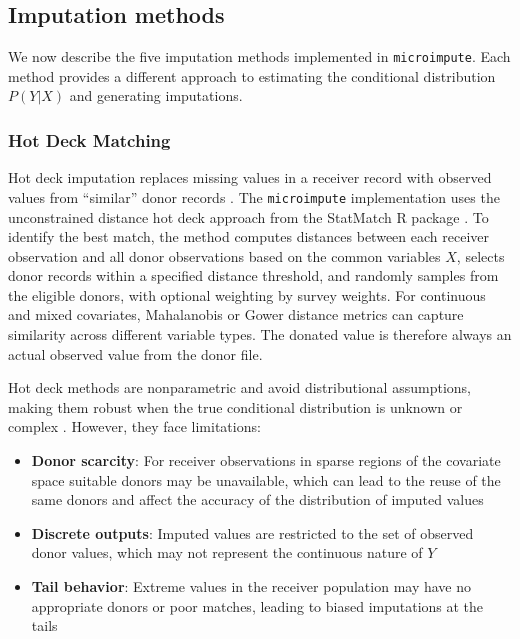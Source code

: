 \subsection{Imputation methods}

We now describe the five imputation methods implemented in \texttt{microimpute}. Each method provides a different approach to estimating the conditional distribution $P(Y|X)$ and generating imputations.

\subsubsection{Hot Deck Matching}

Hot deck imputation replaces missing values in a receiver record with observed values from ``similar'' donor records \citep{andridge2010review}. The \texttt{microimpute} implementation uses the unconstrained distance hot deck approach from the StatMatch R package \citep{dorazio2021statistical}. To identify the best match, the method computes distances between each receiver observation and all donor observations based on the common variables $X$, selects donor records within a specified distance threshold, and randomly samples from the eligible donors, with optional weighting by survey weights. For continuous and mixed covariates, Mahalanobis or Gower distance metrics can capture similarity across different variable types. The donated value is therefore always an actual observed value from the donor file.

Hot deck methods are nonparametric and avoid distributional assumptions, making them robust when the true conditional distribution is unknown or complex \citep{dorazio2006statistical}. However, they face limitations:
\begin{itemize}
    \item \textbf{Donor scarcity}: For receiver observations in sparse regions of the covariate space suitable donors may be unavailable, which can lead to the reuse of the same donors and affect the accuracy of the distribution of imputed values
    \item \textbf{Discrete outputs}: Imputed values are restricted to the set of observed donor values, which may not represent the continuous nature of $Y$
    \item \textbf{Tail behavior}: Extreme values in the receiver population may have no appropriate donors or poor matches, leading to biased imputations at the tails
\end{itemize}


